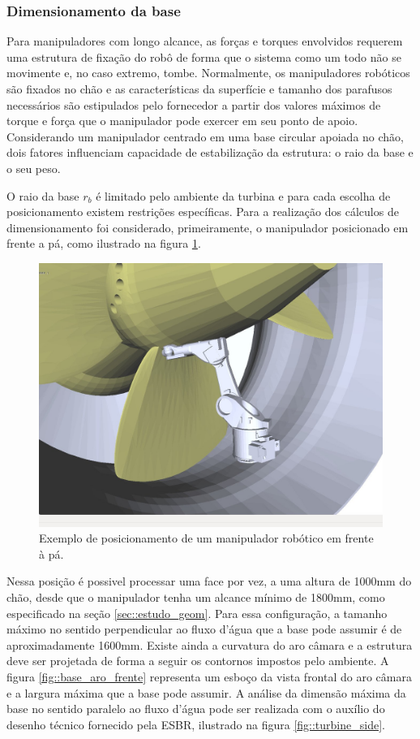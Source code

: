 \subsubsection{Dimensionamento da base}

Para manipuladores com longo alcance, as forças e torques envolvidos requerem
uma estrutura de fixação do robô de forma que o sistema como um todo não se
movimente e, no caso extremo, tombe. Normalmente, os manipuladores robóticos são
fixados no chão e as características da superfície e tamanho dos parafusos
necessários são estipulados pelo fornecedor a partir dos valores máximos de
torque e força que o manipulador pode exercer em seu ponto de apoio.
Considerando um manipulador centrado em uma base circular apoiada no chão, dois
fatores influenciam capacidade de estabilização da estrutura: o raio da base e o seu peso.

O raio da base $r_{b}$ é limitado pelo ambiente da turbina e para cada escolha
de posicionamento existem restrições específicas. 
Para a realização dos cálculos de dimensionamento foi considerado,
primeiramente, o manipulador posicionado em frente a pá, como ilustrado na
figura \ref{fig::robot_front}.

\begin{figure}[h!]
\centering
	\includegraphics[width=0.9\columnwidth]{sota/figs/openrave/robot_front_openrave.jpg}
	\caption{Exemplo de posicionamento de um manipulador robótico em frente à pá.}
	\label{fig::robot_front}
\end{figure}

Nessa posição é possivel processar uma face por
vez, a uma altura de 1000mm do chão, desde que o manipulador tenha um alcance
mínimo de 1800mm, como especificado na seção \ref{sec::estudo_geom}. Para essa
configuração, a tamanho máximo no sentido perpendicular ao fluxo d'água que
a base pode assumir é de aproximadamente 1600mm. Existe ainda a curvatura do aro
câmara e a estrutura deve ser projetada de forma a seguir os
contornos impostos pelo ambiente.
A figura \ref{fig::base_aro_frente} 
representa um esboço da vista frontal do aro câmara e a largura máxima que a
base pode assumir. A análise da dimensão máxima da base no sentido paralelo ao
fluxo d'água pode ser realizada com o auxílio do desenho técnico fornecido pela
ESBR, ilustrado na figura \ref{fig::turbine_side}.

